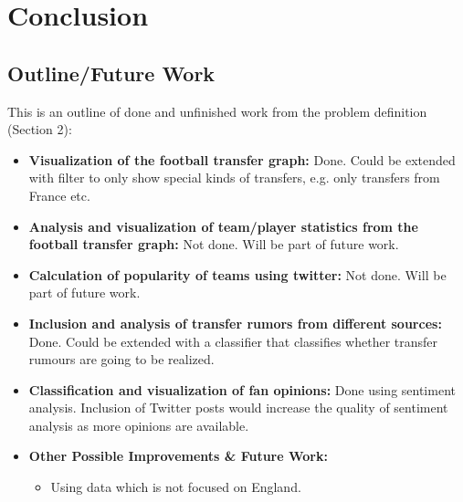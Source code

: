 \documentclass{article}
\begin{document}
\section{Conclusion}


\subsection{Outline/Future Work}
This is an outline of done and unfinished work from the problem definition (Section 2):

\begin{itemize}
\item \textbf{Visualization of the football transfer graph:} Done. Could be extended with filter to only show special kinds of transfers, e.g. only transfers from France etc.
\item \textbf{Analysis and visualization of team/player statistics from the football transfer graph:} Not done. Will be part of future work.
\item \textbf{Calculation of popularity of teams using twitter:} Not done. Will be part of future work.
\item \textbf{Inclusion and analysis of transfer rumors from different sources:} Done. Could be extended with a classifier that classifies whether transfer rumours are going to be realized.	
\item \textbf{Classification and visualization of fan opinions:} Done using sentiment analysis. Inclusion of Twitter posts would increase the quality of sentiment analysis as more opinions are available.
\item \textbf{Other Possible Improvements \& Future Work:}
\begin{itemize}
	\item Using data which is not focused on England. 
\end{itemize}
\end{itemize}


\end{document}
